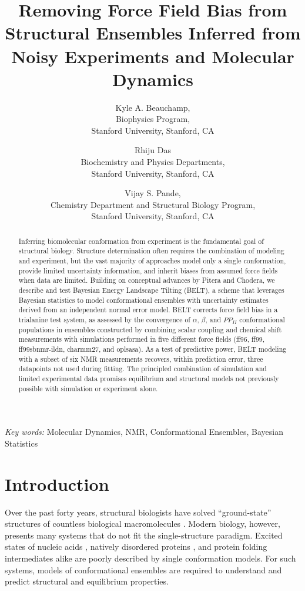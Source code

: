 \documentclass[11pt,titlepage]{article}
\author{Kyle A. Beauchamp, \\
Biophysics Program, \\
Stanford University, Stanford, CA
\and Rhiju Das \\
Biochemistry and Physics Departments, \\
Stanford University, Stanford, CA
\and Vijay S. Pande, \\
Chemistry Department and Structural Biology Program, \\
Stanford University, Stanford, CA
}
\title{Removing Force Field Bias from Structural Ensembles Inferred from Noisy Experiments and Molecular Dynamics}
\begin{document}
\maketitle

\begin{abstract}

Inferring biomolecular conformation from experiment is the fundamental goal of structural biology.  Structure determination often requires the combination of modeling and experiment, but the vast majority of approaches model only a single conformation, provide limited uncertainty information, and inherit biases from assumed force fields when data are limited.  Building on conceptual advances by Pitera and Chodera, we describe and test Bayesian Energy Landscape Tilting (BELT), a scheme that  leverages Bayesian statistics to model conformational ensembles with uncertainty estimates derived from an independent normal error model.  BELT corrects force field bias in a trialanine test system, as assessed by the convergence of $\alpha$, $\beta$, and $PP_{II}$ conformational populations in ensembles constructed by combining scalar coupling and chemical shift measurements with simulations performed in five different force fields (ff96, ff99, ff99sbnmr-ildn, charmm27, and oplsasa).  As a test of predictive power, BELT modeling with a subset of six NMR measurements recovers, within prediction error, three datapoints not used during fitting.  The principled combination of simulation and limited experimental data promises equilibrium and structural models not previously possible with simulation or experiment alone.  

\end{abstract}

\emph{Key words:} Molecular Dynamics, NMR, Conformational Ensembles,  Bayesian Statistics

\section*{Introduction}

Over the past forty years, structural biologists have solved ``ground-state'' structures of countless biological macromolecules \citep{Berman2000}. Modern biology, however, presents many systems that do not fit the single-structure paradigm.  Excited states of nucleic acids \citep{dethoff2012}, natively disordered proteins \citep{fink2005}, and protein folding intermediates \citep{korzhnev2004} alike are poorly described by single conformation models.  For such systems, models of conformational ensembles are required to understand and predict structural and equilibrium properties.  
\end{document}
